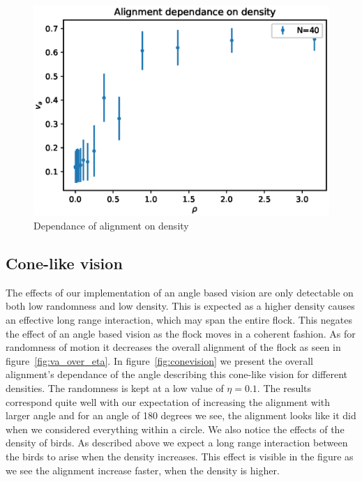 \documentclass[twoside,twocolumn]{article}
\begin{document}
\begin{figure}[!htb]
	\centering
	\includegraphics[width=\columnwidth]{va_over_rho}
	\caption{Dependance of alignment on density}
  \label{fig:va_over_rho}
\end{figure}

\subsection{Cone-like vision}
\label{subsec:conevision}

The effects of our implementation of an angle based vision are only detectable on both low randomness and low density. This is expected as a higher density causes an effective long range interaction, which may span the entire flock. This negates the effect of an angle based vision as the flock moves in a coherent fashion. As for randomness of motion it decreases the overall alignment of the flock as seen in figure~\ref{fig:va_over_eta}. In figure~\ref{fig:conevision} we present the overall alignment's dependance of the angle describing this cone-like vision for different densities. The randomness is kept at a low value of $\eta=0.1$. The results correspond quite well with our expectation of increasing the alignment with larger angle and for an angle of 180 degrees we see, the alignment looks like it did when we considered everything within a circle. We also notice the effects of the density of birds. As described above we expect a long range interaction between the birds to arise when the density increases. This effect is visible in the figure as we see the alignment increase faster, when the density is higher.
\end{document}
